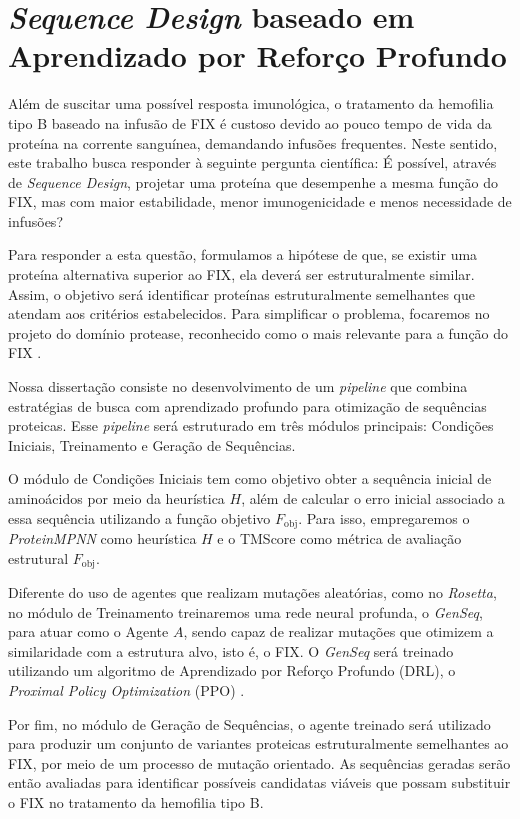 \section{\textit{Sequence Design} baseado em Aprendizado por Reforço Profundo} 
\label{section:Proposta}

Além de suscitar uma possível resposta imunológica, 
o tratamento da hemofilia tipo B baseado na infusão de  FIX
é custoso devido ao pouco tempo de vida da proteína na corrente sanguínea, demandando infusões frequentes. 
Neste sentido, este trabalho busca responder à seguinte pergunta científica: 
É possível, através de \textit{Sequence Design}, projetar uma proteína que desempenhe a mesma função do FIX, 
mas com maior estabilidade, menor imunogenicidade e menos necessidade de infusões?

Para responder a esta questão, formulamos a hipótese de que, 
se existir uma proteína alternativa superior ao FIX, 
ela deverá ser estruturalmente similar. 
Assim, o objetivo será identificar proteínas estruturalmente semelhantes que atendam aos critérios estabelecidos.
Para simplificar o problema, focaremos no projeto do domínio protease, 
reconhecido como o mais relevante para a função do FIX \cite{FIX}.

Nossa dissertação consiste no desenvolvimento de um \textit{pipeline} que combina estratégias de busca 
com aprendizado profundo para otimização de sequências proteicas. 
Esse \textit{pipeline} será estruturado em três módulos principais: Condições Iniciais, 
Treinamento e Geração de Sequências.


O módulo de Condições Iniciais tem como objetivo obter a sequência inicial de aminoácidos 
por meio da heurística \( H \), além de calcular o erro inicial associado a essa sequência 
utilizando a função objetivo \( F_{\text{obj}} \). 
Para isso, empregaremos o \textit{ProteinMPNN} como heurística \( H \) 
e o TMScore como métrica de avaliação estrutural \( F_{\text{obj}} \).  

Diferente do uso de agentes que realizam mutações aleatórias, como no \textit{Rosetta},
no módulo de Treinamento treinaremos uma rede neural profunda, o \textit{GenSeq}, para atuar como o Agente $A$,
sendo capaz de realizar mutações que otimizem a similaridade com a estrutura alvo, isto é, o FIX.
O \textit{GenSeq} será treinado utilizando um algoritmo de Aprendizado por Reforço Profundo (DRL), 
o \textit{Proximal Policy Optimization} (PPO) \cite{PPO}.

Por fim, no módulo de Geração de Sequências, 
o agente treinado será utilizado para produzir um conjunto de variantes proteicas estruturalmente semelhantes ao FIX,
por meio de um processo de mutação orientado. 
As sequências geradas serão então avaliadas para identificar possíveis candidatas viáveis 
que possam substituir o FIX no tratamento da hemofilia tipo B.

